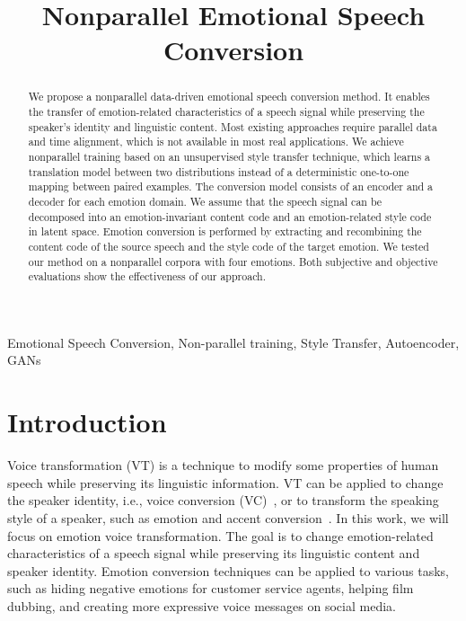 \documentclass{article}
\title{Nonparallel Emotional Speech Conversion}
\begin{document}
%
\maketitle
%
\begin{abstract}
We propose a nonparallel data-driven emotional speech conversion method. It enables the transfer of emotion-related characteristics of a speech signal while preserving the speaker's identity and linguistic content. Most existing approaches require parallel data and time alignment, which is not available in most real applications. We achieve nonparallel training based on an unsupervised style transfer technique, which learns a translation model between two distributions instead of a deterministic one-to-one mapping between paired examples. The conversion model consists of an encoder and a decoder for each emotion domain. We assume that the speech signal can be decomposed into an emotion-invariant content code and an emotion-related style code in latent space. Emotion conversion is performed by extracting and recombining the content code of the source speech and the style code of the target emotion. We tested our method on a nonparallel corpora with four emotions. Both subjective and objective evaluations show the effectiveness of our approach.
\end{abstract}

%
\begin{keywords}
Emotional Speech Conversion, Non-parallel training, Style Transfer, Autoencoder, GANs
\end{keywords}
%



\section{Introduction}
\label{sec:intro}
Voice transformation (VT) is a technique to modify some properties of human speech while preserving its linguistic information. VT can be applied to change the speaker identity, i.e., voice conversion (VC)~\cite{mohammadi2017overview}, or to transform the speaking style of a speaker, such as emotion and accent conversion~\cite{zhao2018accent}. In this work, we will focus on emotion voice transformation. The goal is to change emotion-related characteristics of a speech signal while preserving its linguistic content and speaker identity. Emotion conversion techniques can be applied to various tasks, such as hiding negative emotions for customer service agents, helping film dubbing, and creating more expressive voice messages on social media.
\end{document}
